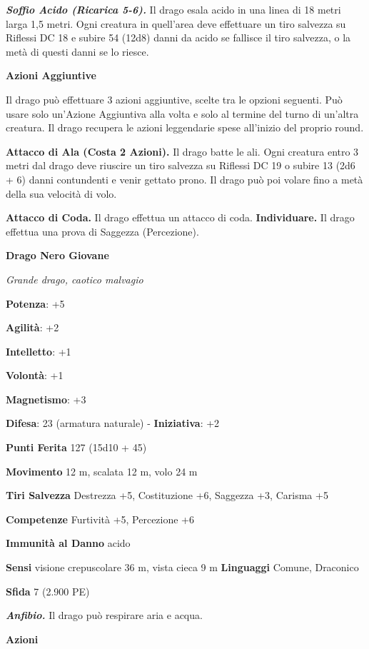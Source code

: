 \begin{multicols}{2}
\emph{\textbf{Soffio Acido (Ricarica 5-6).}} Il drago esala acido in una
linea di 18 metri larga 1,5 metri. Ogni creatura in quell'area deve
effettuare un tiro salvezza su Riflessi DC 18 e subire 54 (12d8) danni
da acido se fallisce il tiro salvezza, o la metà di questi danni se lo
riesce.

\textbf{Azioni Aggiuntive}

Il drago può effettuare 3 azioni aggiuntive, scelte tra le opzioni
seguenti. Può usare solo un'Azione Aggiuntiva alla volta e solo al
termine del turno di un'altra creatura. Il drago recupera le azioni
leggendarie spese all'inizio del proprio round.

\textbf{Attacco di Ala (Costa 2 Azioni).} Il drago batte le ali. Ogni
creatura entro 3 metri dal drago deve riuscire un tiro salvezza su Riflessi DC 19 o subire 13 (2d6 + 6) danni contundenti e venir gettato
prono. Il drago può poi volare fino a metà della sua velocità di volo.

\textbf{Attacco di Coda.} Il drago effettua un attacco di coda.
\textbf{Individuare.} Il drago effettua una prova di Saggezza
(Percezione).

\textbf{Drago Nero Giovane}

\emph{Grande drago, caotico malvagio}

\textbf{Potenza}: +5

\textbf{Agilità}: +2

\textbf{Intelletto}: +1

\textbf{Volontà}: +1

\textbf{Magnetismo}: +3

\textbf{Difesa}: 23 (armatura naturale) - \textbf{Iniziativa}: +2

\textbf{Punti Ferita} 127 (15d10 + 45)

\textbf{Movimento} 12 m, scalata 12 m, volo 24 m

\textbf{Tiri Salvezza} Destrezza +5, Costituzione +6, Saggezza +3,
Carisma +5

\textbf{Competenze} Furtività +5, Percezione +6

\textbf{Immunità al Danno} acido

\textbf{Sensi} visione crepuscolare 36 m, vista cieca 9 m
\textbf{Linguaggi} Comune, Draconico

\textbf{Sfida} 7 (2.900 PE)\smallskip

\emph{\textbf{Anfibio.}} Il drago può respirare aria e acqua.

\smallskip\textbf{Azioni}


\end{multicols}
